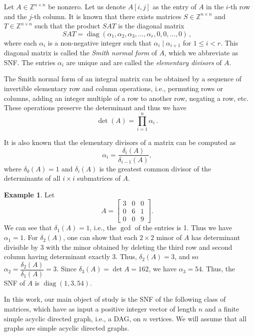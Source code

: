 \documentclass[12pt]{amsart}
\theoremstyle{definition}
\newtheorem{example}[thm]{Example}
\numberwithin{equation}{section}
\newcommand{\ring}[1]{\ensuremath{\mathbb{#1}}}
\renewcommand\>{\rangle}
\newcommand\<{\langle}
\newcommand\0{\mathbf{0}}
\newcommand\ZZ{\ring{Z}}
\DeclareMathOperator{\diag}{diag}
\begin{document}
Let $A \in \ZZ^{n \times n}$ be nonzero. 
Let us denote $A[i,j]$ as the entry of $A$ in the $i$-th row and the $j$-th column.
It is known \cite{newmanbook} that there exists matrices $S \in \ZZ^{n\times n}$ and $T \in \ZZ^{n \times n}$ such that the product $SAT$ is the diagonal matrix
\[
SAT = \diag(\alpha_1,\alpha_2,\alpha_3,\dots, \alpha_r, 0, 0 ,\dots, 0) \, ,
\]
where each $\alpha_i$ is a non-negative integer such that $\alpha_i \mid \alpha_{i+1}$ for $1 \leq i < r$. 
This diagonal matrix is called the \emph{Smith normal form} of $A$, which we abbreviate as SNF. 
The entries $\alpha_i$ are unique and are called the \emph{elementary divisors} of $A$. 

The Smith normal form of an integral matrix can be obtained by a sequence of invertible elementary row and column operations, i.e., permuting rows or columns, adding an integer multiple of a row to another row, negating a row, etc.
These operations preserve the determinant and thus we have
\[
\det(A) = \prod_{i=1}^{n} \alpha_i \, .
\]

It is also known \cite{newmanbook} that the elementary divisors of a matrix can be computed as
\begin{equation}\label{eq:elementary_divisors_computation}
	\alpha_i = \frac{\delta_i(A)}{\delta_{i-1}(A)},
\end{equation}
where $\delta_0(A) = 1$ and $\delta_i(A)$ is the greatest common divisor of the determinants of all $i\times i$ submatrices of $A$.


\begin{example}
	Let 
	\[A = \begin{bmatrix}
		3 & 0 & 0 \\
		0 & 6 & 1 \\
		0 & 0 & 9
	\end{bmatrix}.\]
	We can see that $\delta_1(A) = 1$, i.e., the $\gcd$ of the entries is 1. 
	Thus we have $\alpha_1 = 1$. 
	For $\delta_2(A)$, one can show that each $2 \times 2$ minor of $A$ has determinant divisible by $3$ with the minor obtained by deleting the third row and second column having determinant exactly 3. 
	Thus, $\delta_2(A) = 3$, and so $\alpha_2 = \dfrac{\delta_2(A)}{\delta_1(A)} = 3$. Since $\delta_3(A) = \det A = 162$, we have $\alpha_3 = 54$. 
	Thus, the SNF of $A$ is $\diag(1,3,54)$.
\end{example}

In this work, our main object of study is the SNF of the following class of matrices, which have as input a positive integer vector of length $n$ and a finite simple acyclic directed graph, i.e., a DAG, on $n$ vertices. We will assume that all graphs are simple acyclic directed graphs.
\end{document}
